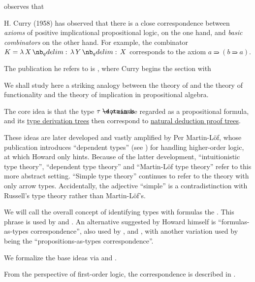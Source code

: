 \begin{remark}\label{rem:church_and_curry_typing}

\end{remark}

\begin{remark}\label{rem:dependent_types}
\end{remark}

\begin{concept}\label{con:curry_howard_correspondence}
   observes that
  \begin{displayquote}
    H. Curry (1958) has observed that there is a close correspondence between \textit{axioms} of positive implicational propositional logic, on the one hand, and \textit{basic combinators} on the other hand. For example, the combinator \( K = \qabs X \qabs Y X \) corresponds to the axiom \( a \rightimply (b \rightimply a) \).
  \end{displayquote}

  The publication he refers to is \cite[312]{CurryFeys1958CombinatoryLogic}, where Curry begins the section with
  \begin{displayquote}
    We shall study here a striking analogy between the theory of and the theory of functionality and the theory of implication in propositional algebra.
  \end{displayquote}

  The core idea is that the type \( \tau \synimplies \rho \) can be regarded as a propositional formula, and its \hyperref[def:type_derivation_tree]{type derivation trees} then correspond to \hyperref[def:natural_deduction_proof_tree]{natural deduction proof trees}.

  These ideas are later developed and vastly amplified by Per Martin-L\"of, whose publication \cite{MartinLöf1975TypeTheory} introduces \enquote{dependent types} (see ) for handling higher-order logic, at which Howard only hints. Because of the latter development, \enquote{intuitionistic type theory}, \enquote{dependent type theory} and \enquote{Martin-L\"of type theory} refer to this more abstract setting. \enquote{Simple type theory} continues to refer to the theory with only arrow types. Accidentally, the adjective \enquote{simple} is a contradistinction with Russell's type theory rather than Martin-L\"of's.

  We will call the overall concept of identifying types with formulas the . This phrase is used by  and . An alternative suggested by Howard himself is \enquote{formulas-as-types correspondence}, also used by ,  and , with another variation used by  being the \enquote{propositions-as-types correspondence}.

  We formalize the base ideas via  and .
\end{concept}
\begin{comments}
  \item From the perspective of first-order logic, the correspondence is described in .
\end{comments}
